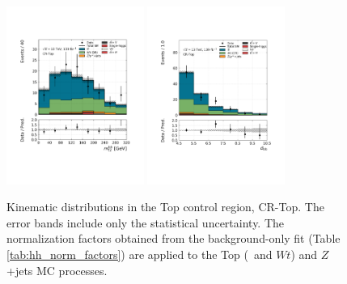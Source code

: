 \begin{figure}[!htb]
    \includegraphics[width=0.4\textwidth]{figures/search_hh/bkg_estimate/crvr/crtop/crtoptest_mt2_bb}
    \includegraphics[width=0.4\textwidth]{figures/search_hh/bkg_estimate/crvr/crtop/crtoptest_NN_d_hh}
    \caption{
    Kinematic distributions in the Top control region, CR-Top.
    The error bands include only the statistical uncertainty.
    The normalization factors obtained from the background-only fit (Table \ref{tab:hh_norm_factors}) are applied
    to the Top (\ttbar~and $Wt$) and $Z$+jets MC processes.
    }
    \label{fig:crtop_kin_plots_2}
\end{figure}
